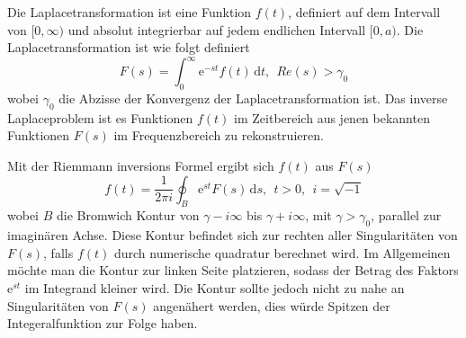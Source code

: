 %
%
%
Die Laplacetransformation ist eine Funktion $f(t)$, definiert auf dem Intervall von $[0, \infty)$ und absolut integrierbar auf jedem endlichen Intervall $[0, a)$. 
Die Laplacetransformation ist wie folgt definiert
\[
F(s) = \int_0^\infty \mathrm{e}^{-st}f(t)\,\mathrm{d}t,~~Re(s)>\gamma_{0}
\]
wobei $\gamma_{0}$ die Abzisse der Konvergenz der Laplacetransformation ist. 
Das inverse Laplaceproblem ist es Funktionen $f(t)$ im Zeitbereich aus jenen bekannten Funktionen $F(s)$ im Frequenzbereich zu rekonstruieren.

Mit der Riemmann inversions Formel ergibt sich $f(t)$ aus $F(s)$
\[
f(t) = \frac{1}{2\pi i} \oint_{B} \mathrm{e}^{st}F(s)\,\mathrm{d}s,~~t>0,~~i=\sqrt{-1}
\]
wobei $B$ die Bromwich Kontur von $\gamma-i\infty$ bis $\gamma+i\infty$, mit $\gamma>\gamma_{0}$, parallel zur imaginären Achse.
Diese Kontur befindet sich zur rechten aller Singularitäten von $F(s)$, falls $f(t)$ durch numerische quadratur berechnet wird.
Im Allgemeinen möchte man die Kontur zur linken Seite platzieren, sodass der Betrag des Faktors $\mathrm{e}^{st}$ im Integrand kleiner wird.
Die Kontur sollte jedoch nicht zu nahe an Singularitäten von $F(s)$ angenähert werden, dies würde Spitzen der Integeralfunktion zur Folge haben.


